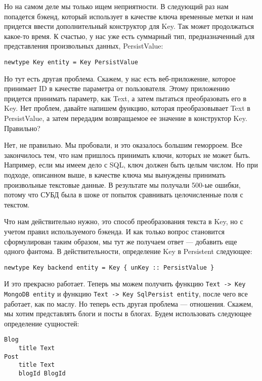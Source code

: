 Но на самом деле мы только ищем неприятности. В следующий раз нам попадется бэкенд, который использует в качестве ключа временные метки и нам придется ввести дополнительный конструктор для Key. Так может продолжаться какое-то время. К счастью, у нас уже есть суммарный тип, предназначенный для представления произвольных данных, PersistValue:

\begin{lstlisting}
newtype Key entity = Key PersistValue
\end{lstlisting}

Но тут есть другая проблема. Скажем, у нас есть веб-приложение, которое принимает ID в качестве параметра от пользователя. Этому приложению придется принимать параметр, как Text, а затем пытаться преобразовать его в Key. Нет проблем, давайте напишем функцию, которая преобразовывает Text в PersistValue, а затем передадим возвращаемое ее значение в конструктор Key. Правильно?

Нет, не правильно. Мы пробовали, и это оказалось большим геморроем. Все закончилось тем, что нам пришлось принимать ключи, которых не может быть. Например, если мы имеем дело с SQL, ключ должен быть целым числом. Но при подходе, описанном выше, в качестве ключа мы вынуждены принимать произвольные текстовые данные. В результате мы получали 500-ые ошибки, потому что СУБД была в шоке от попыток сравнивать целочисленные поля с текстом.

Что нам действительно нужно, это способ преобразования текста в Key, но с учетом правил используемого бэкенда. И как только вопрос становится сформулирован таким образом, мы тут же получаем ответ --- добавить еще одного фантома. В действительности, определение Key в Persistent следующее:

\begin{lstlisting}
newtype Key backend entity = Key { unKey :: PersistValue }
\end{lstlisting}

И это прекрасно работает. Теперь мы можем получить функцию \lstinline'Text -> Key MongoDB entity' и функцию \lstinline'Text -> Key SqlPersist entity', после чего все работает, как по маслу. Но теперь есть другая проблема --- отношения. Скажем, мы хотим представлять блоги и посты в блогах. Будем использовать следующее определение сущностей:

\begin{lstlisting}
Blog
    title Text
Post
    title Text
    blogId BlogId
\end{lstlisting}

